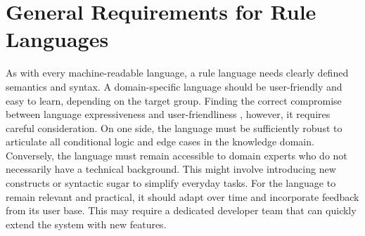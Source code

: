 \section{General Requirements for Rule Languages}\label{sec:general-rule-language-requirements}
As with every machine-readable language, a rule language needs clearly defined semantics and syntax.
A domain-specific language should be user-friendly and easy to learn, depending on the target group.
Finding the correct compromise between language expressiveness and user-friendliness \cite{https://doi.org/10.1002/widm.11},
however, it requires careful consideration.
On one side, the language must be sufficiently robust to articulate all conditional logic and edge cases in the knowledge domain.
Conversely, the language must remain accessible to domain experts who do not necessarily have a technical background.
This might involve introducing new constructs or syntactic sugar to simplify everyday tasks.
For the language to remain relevant and practical, it should adapt over time and incorporate feedback from its user base.
This may require a dedicated developer team that can quickly extend the system with new features.

%
%

